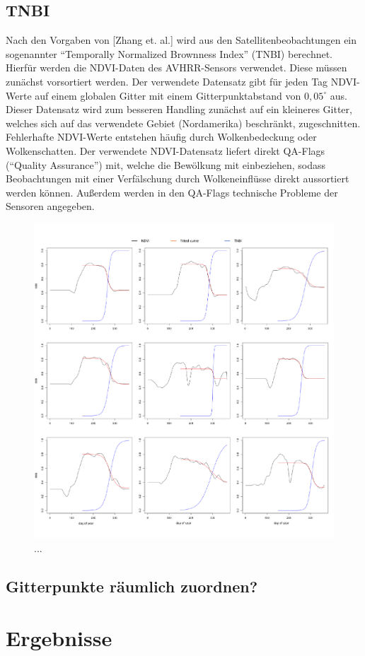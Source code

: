 \documentclass[]{article}
\begin{document}
\subsection{TNBI}
Nach den Vorgaben von [Zhang et. al.] wird aus den Satellitenbeobachtungen ein sogenannter \enquote{Temporally Normalized Brownness Index} (TNBI) berechnet. Hierfür werden die NDVI-Daten des AVHRR-Sensors verwendet. Diese müssen zunächst vorsortiert werden. Der verwendete Datensatz gibt für jeden Tag NDVI-Werte auf einem globalen Gitter mit einem Gitterpunktabstand von $0,05^\circ$ aus. Dieser Datensatz wird zum besseren Handling zunächst auf ein kleineres Gitter, welches sich auf das verwendete Gebiet (Nordamerika) beschränkt, zugeschnitten. Fehlerhafte NDVI-Werte entstehen häufig durch Wolkenbedeckung oder Wolkenschatten. Der verwendete NDVI-Datensatz liefert direkt QA-Flags (\enquote{Quality Assurance}) mit, welche die Bewölkung mit einbeziehen, sodass Beobachtungen mit einer Verfälschung durch Wolkeneinflüsse direkt aussortiert werden können. Außerdem werden in den QA-Flags technische Probleme der Sensoren angegeben. 
\begin{figure}
	
  \includegraphics[width=1.\textwidth]{abb1a.pdf}
	\caption{...}
	\label{fig2}
\end{figure}
\subsection{Gitterpunkte räumlich zuordnen?}
\section{Ergebnisse}
\end{document}
